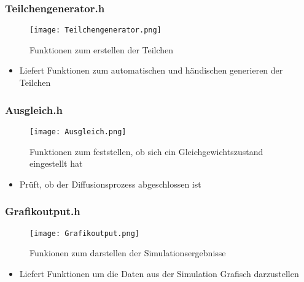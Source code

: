 \documentclass{beamer}
\begin{document}
\begin{frame} %
  \frametitle{Teilchengenerator.h} %
  \begin{figure}
		\centering
		\texttt{[image: Teilchengenerator.png]}
		\caption{Funktionen zum erstellen der Teilchen}
  \end{figure}
  \begin{itemize}
  	\item Liefert Funktionen zum automatischen und händischen generieren der Teilchen
  \end{itemize}
\end{frame}

\begin{frame} %
  \frametitle{Ausgleich.h} %
  \begin{figure}
		\centering
		\texttt{[image: Ausgleich.png]}
		\caption{Funktionen zum feststellen, ob sich ein Gleichgewichtszustand eingestellt hat}
  \end{figure}
  \begin{itemize}
  	\item Prüft, ob der Diffusionsprozess abgeschlossen ist
  \end{itemize}
\end{frame}

\begin{frame} %
  \frametitle{Grafikoutput.h} %
  \begin{figure}
		\centering
		\texttt{[image: Grafikoutput.png]}
		\caption{Funkionen zum darstellen der Simulationsergebnisse}
  \end{figure}
  \begin{itemize}
  	\item Liefert Funktionen um die Daten aus der Simulation Grafisch darzustellen
  \end{itemize}
\end{frame}
\end{document}

